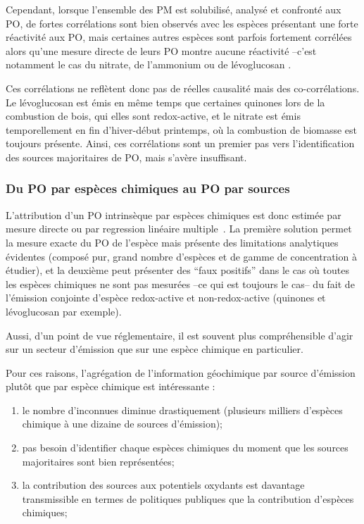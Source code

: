 Cependant, lorsque l'ensemble des PM est solubilisé, analysé et confronté aux PO, de
fortes corrélations sont bien observés avec les espèces présentant une forte réactivité aux
PO, mais certaines autres espèces sont parfois fortement corrélées alors qu'une mesure
directe de leurs PO montre aucune réactivité --c'est notamment le cas du nitrate,
de l'ammonium ou de lévoglucosan \autocite{vermaRedox2009,calasComparison2018,calasSeasonal2019}.

Ces corrélations ne reflètent donc pas de réelles causalité mais des co-corrélations. Le
lévoglucosan est émis en même temps que certaines quinones lors de la combustion de bois,
qui elles sont redox-active, et le nitrate est émis temporellement en fin d'hiver-début
printemps, où la combustion de biomasse est toujours présente. 
Ainsi, ces corrélations sont un premier pas vers l'identification des sources majoritaires
de PO, mais s'avère insuffisant.

\subsubsection{Du PO par espèces chimiques au PO par sources}

L'attribution d'un PO intrinsèque par espèces chimiques est donc estimée par mesure
directe ou par regression linéaire
multiple~\autocite{calasImportance2017,borlazaOxidative2018}. La première solution permet
la mesure exacte du PO de l'espèce mais présente des limitations analytiques évidentes
(composé pur, grand nombre d'espèces et de gamme de concentration à étudier), et la
deuxième peut présenter des ``faux positifs'' dans le cas où toutes les espèces chimiques
ne sont pas mesurées --ce qui est toujours le cas-- du fait de l'émission conjointe
d'espèce redox-active et non-redox-active (quinones et lévoglucosan par exemple).

Aussi, d'un point de vue réglementaire, il est souvent plus compréhensible d'agir sur
un secteur d'émission que sur une espèce chimique en particulier.

Pour ces raisons, l'agrégation de l'information géochimique par source d'émission plutôt
que par espèce chimique est intéressante :
\begin{enumerate}
    \item le nombre d'inconnues diminue drastiquement (plusieurs milliers d'espèces
        chimique à une dizaine de sources d'émission);
    \item pas besoin d'identifier chaque espèces chimiques du moment que les sources
        majoritaires sont bien représentées;
    \item la contribution des sources aux potentiels oxydants est davantage transmissible
        en termes de politiques publiques que la contribution d'espèces chimiques;
\end{enumerate}

